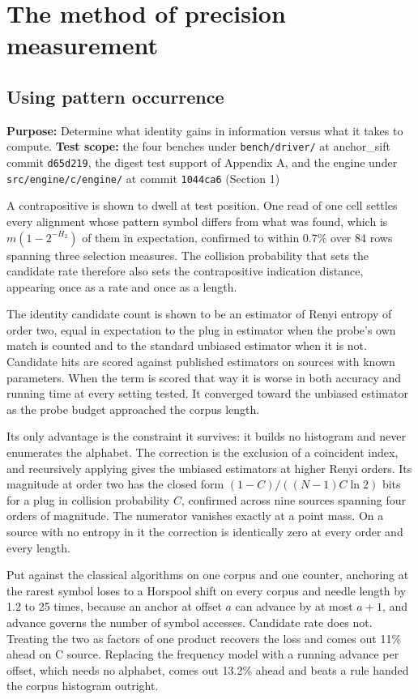 \chapter{The method of precision measurement}

\section{Using pattern occurrence}

\textbf{Purpose:} Determine what identity gains in information versus what it takes to compute. \textbf{Test scope:} the four benches under \texttt{bench/\allowbreak{}driver/\allowbreak{}} at anchor\_sift commit \texttt{d65d219}, the digest test support of Appendix A, and the engine under \texttt{src/\allowbreak{}engine/\allowbreak{}c/\allowbreak{}engine/\allowbreak{}} at commit \texttt{1044ca6} (Section 1)

A contrapositive is shown to dwell at test position. One read of one cell settles every alignment whose pattern symbol differs from what was found, which is \(m(1-2^{-H_2})\) of them in expectation, confirmed to within 0.7\% over 84 rows spanning three selection measures. The collision probability that sets the candidate rate therefore also sets the contrapositive indication distance, appearing once as a rate and once as a length.

The identity candidate count is shown to be an estimator of Renyi entropy of order two, equal in expectation to the plug in estimator when the probe's own match is counted and to the standard unbiased estimator when it is not. Candidate hits are scored against published estimators on sources with known parameters. When the term is scored that way it is worse in both accuracy and running time at every setting tested. It converged toward the unbiased estimator as the probe budget approached the corpus length.

Its only advantage is the constraint it survives: it builds no histogram and never enumerates the alphabet. The correction is the exclusion of a coincident index, and recursively applying gives the unbiased estimators at higher Renyi orders. Its magnitude at order two has the closed form \((1-C)/((N-1)C\ln 2)\) bits for a plug in collision probability \(C\), confirmed across nine sources spanning four orders of magnitude. The numerator vanishes exactly at a point mass. On a source with no entropy in it the correction is identically zero at every order and every length.

Put against the classical algorithms on one corpus and one counter, anchoring at the rarest symbol loses to a Horspool shift on every corpus and needle length by 1.2 to 25 times, because an anchor at offset \(a\) can advance by at most \(a+1\), and advance governs the number of symbol accesses. Candidate rate does not. Treating the two as factors of one product recovers the loss and comes out 11\% ahead on C source. Replacing the frequency model with a running advance per offset, which needs no alphabet, comes out 13.2\% ahead and beats a rule handed the corpus histogram outright.

